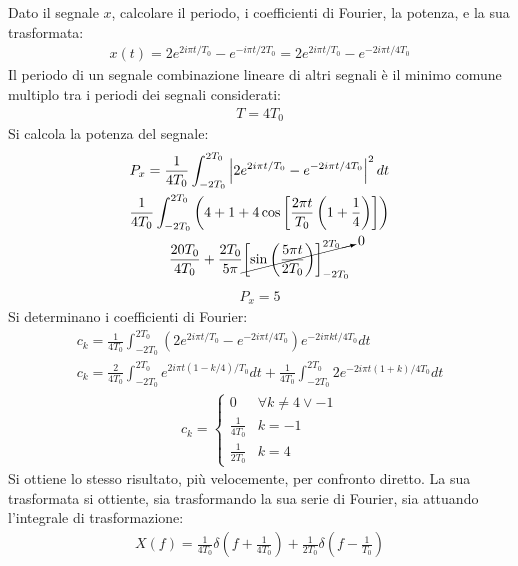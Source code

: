 \documentclass{article}
\begin{document}
Dato il segnale $x$, calcolare il periodo, i coefficienti di Fourier, la potenza, e la sua trasformata:
\begin{gather*}
    x(t)=2e^{2i\pi t/T_0}-e^{-i\pi t/2T_0}=2e^{2i\pi t/T_0}-e^{-2i\pi t/4T_0}
\end{gather*}
Il periodo di un segnale combinazione lineare di altri segnali è il minimo comune multiplo tra i periodi dei segnali considerati:
\begin{gather}
    T=4T_0
\end{gather}
Si calcola la potenza del segnale:
\begin{gather*}
    P_x=\displaystyle\frac{1}{4T_0}\int_{-2T_0}^{2T_0}\left|2e^{2i\pi t/T_0}-e^{-2i\pi t/4T_0}\right|^2dt\\
    \displaystyle\frac{1}{4T_0}\int_{-2T_0}^{2T_0}\left(4+1+4\cos\left[\frac{2\pi t}{T_0}\left(1+\frac{1}{4}\right)\right]\right)\\
    \displaystyle\frac{20T_0}{4T_0}+\frac{2T_0}{5\pi }\cancelto{0}{\left[\sin\left(\frac{5\pi t}{2T_0}\right)\right]_{-2T_0}^{2T_0}}
\end{gather*}
\begin{gather}
    P_x=5
\end{gather}
Si determinano i coefficienti di Fourier:
\begin{gather*}
    c_k=\displaystyle\frac{1}{4T_0}\int_{-2T_0}^{2T_0}\left(2e^{2i\pi t/T_0}-e^{-2i\pi t/4T_0}\right)e^{-2i\pi kt/4T_0}dt\\
    c_k=\displaystyle\frac{2}{4T_0}\int_{-2T_0}^{2T_0}e^{2i\pi t(1-k/4)/T_0}dt+\frac{1}{4T_0}\int_{-2T_0}^{2T_0}2e^{-2i\pi t(1+k)/4T_0}dt
\end{gather*}
\begin{gather}
    c_k=\begin{cases}
        0 &\forall k\neq4\lor-1\\
        \displaystyle\frac{1}{4T_0}& k=-1\\
        \displaystyle\frac{1}{2T_0}&k=4
    \end{cases}
\end{gather}
Si ottiene lo stesso risultato, più velocemente, per confronto diretto. La sua trasformata si ottiente, sia trasformando la sua serie di Fourier, sia attuando l'integrale 
di trasformazione:
\begin{gather}
    X(f)=\displaystyle\frac{1}{4T_0}\delta\left(f+\frac{1}{4T_0}\right)+\frac{1}{2T_0}\delta\left(f-\frac{1}{T_0}\right)
\end{gather}
\end{document}
